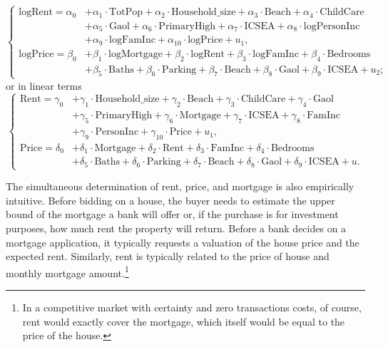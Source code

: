 \documentclass[11pt,review,authoryear]{elsarticle}
\begin{document}
\begin{equation}
  \begin{cases}
    \mathrm{logRent} = \alpha_0 & + \alpha_1 \cdot \mathrm{TotPop} + \alpha_2 \cdot \mathrm{Household\_size} + \alpha_3 \cdot \mathrm{Beach} + \alpha_4 \cdot \mathrm{ChildCare} \\
    & + \alpha_5 \cdot \mathrm{Gaol} + \alpha_6 \cdot \mathrm{PrimaryHigh}  + \alpha_7 \cdot \mathrm{ICSEA} + \alpha_8 \cdot \mathrm{logPersonInc} \\
    & + \alpha_9 \cdot \mathrm{logFamInc} + \alpha_{10} \cdot \mathrm{logPrice} + u_1, \\
    \mathrm{logPrice} = \beta_0 & + \beta_1 \cdot \mathrm{logMortgage} + \beta_2 \cdot \mathrm{logRent} + \beta_3 \cdot \mathrm{logFamInc} + \beta_4 \cdot \mathrm{Bedrooms} \\
    & + \beta_5 \cdot \mathrm{Baths} + \beta_6 \cdot \mathrm{Parking} + \beta_7 \cdot \mathrm{Beach} + \beta_8 \cdot \mathrm{Gaol} + \beta_9 \cdot \mathrm{ICSEA} + u_2;
  \end{cases}
\label{eqn:SEM_linear}
%
\end{equation}
%
or in linear terms
%
\begin{equation}
  \begin{cases}
    \mathrm{Rent} = \gamma_0 & + \gamma_1 \cdot \mathrm {Household\_size} + \gamma_2 \cdot \mathrm{Beach} + \gamma_3 \cdot \mathrm{ChildCare} + \gamma_4 \cdot \mathrm{Gaol} \\
    & + \gamma_5 \cdot \mathrm{PrimaryHigh} + \gamma_6 \cdot \mathrm{Mortgage} + \gamma_7 \cdot \mathrm{ICSEA} + \gamma_8 \cdot \mathrm{FamInc} \\
    & + \gamma_9 \cdot \mathrm{PersonInc} + \gamma_{10} \cdot \mathrm{Price} + u_1, \\
    \mathrm{Price} = \delta_0 & + \delta_1 \cdot \mathrm{Mortgage} + \delta_2 \cdot \mathrm{Rent} +
    \delta_3 \cdot \mathrm{FamInc} + \delta_4 \cdot \mathrm{Bedrooms} \\
    & + \delta_5 \cdot \mathrm{Baths} + \delta_6 \cdot \mathrm{Parking} + \delta_7 \cdot \mathrm{Beach} + \delta_8 \cdot \mathrm{Gaol} + \delta_9 \cdot \mathrm{ICSEA} + u.
  \end{cases}
  \label{eqn:SEM_log}
\end{equation}

The simultaneous determination of rent, price, and mortgage is also empirically intuitive. Before bidding on a house, the buyer needs to estimate the upper bound of the mortgage a bank will offer or, if the purchase is for investment purposes, how much rent the property will return. Before a bank decides on a mortgage application, it typically requests a valuation of the house price and the expected rent. Similarly, rent is typically related to the price of house and monthly mortgage amount.\footnote{In a competitive market with certainty and zero transactions costs, of course, rent would exactly cover the mortgage, which itself would be equal to the price of the house.}
\end{document}
